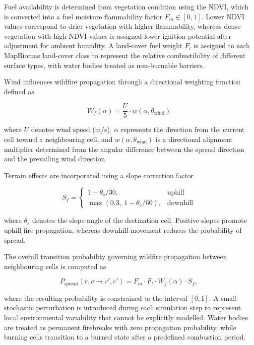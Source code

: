 \documentclass{ieeeaccess}
\begin{document}
Fuel availability is determined from vegetation condition using the NDVI, which is converted into a fuel moisture flammability factor $F_m \in [0,1]$. Lower NDVI values correspond to drier vegetation with higher flammability, whereas dense vegetation with high NDVI values is assigned lower ignition potential after adjustment for ambient humidity. A land-cover fuel weight $F_t$ is assigned to each MapBiomas land-cover class to represent the relative combustibility of different surface types, with water bodies treated as non-burnable barriers.

Wind influences wildfire propagation through a directional weighting function defined as

\begin{equation}
W_f(\alpha)=\frac{U}{5}\cdot w(\alpha,\theta_{\text{wind}})
\label{eq:wind}
\end{equation}

where $U$ denotes wind speed (m/s), $\alpha$ represents the direction from the current cell toward a neighbouring cell, and $w(\alpha,\theta_{\text{wind}})$ is a directional alignment multiplier determined from the angular difference between the spread direction and the prevailing wind direction.

Terrain effects are incorporated using a slope correction factor

\begin{equation}
S_f=
\begin{cases}
1+\theta_s/30, & \text{uphill}\\
\max(0.3,\;1-\theta_s/60), & \text{downhill}
\end{cases}
\label{eq:slope}
\end{equation}

where $\theta_s$ denotes the slope angle of the destination cell. Positive slopes promote uphill fire propagation, whereas downhill movement reduces the probability of spread.

The overall transition probability governing wildfire propagation between neighbouring cells is computed as

\begin{equation}
P_{\text{spread}}(r,c \rightarrow r',c')
=
F_m
\cdot
F_t
\cdot
W_f(\alpha)
\cdot
S_f,
\label{eq:spread}
\end{equation}

where the resulting probability is constrained to the interval $[0,1]$. A small stochastic perturbation is introduced during each simulation step to represent local environmental variability that cannot be explicitly modelled. Water bodies are treated as permanent firebreaks with zero propagation probability, while burning cells transition to a burned state after a predefined combustion period.
\end{document}
